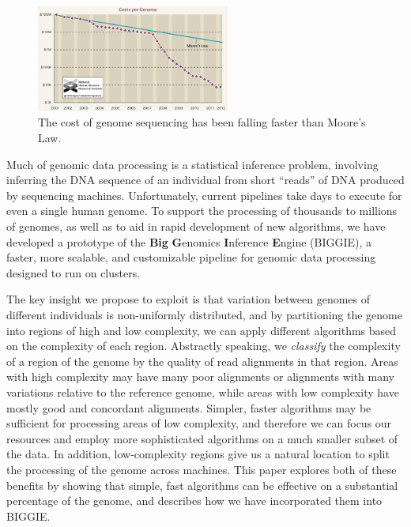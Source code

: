 \documentclass[12pt]{article}
\newcommand\TODO[1]{\textcolor{red}{TODO: #1}}
\begin{document}
\begin{figure}[h!]
  \centering
  \includegraphics[width=2.5in]{figs/sequencing-costs.png}
  \caption{The cost of genome sequencing has been falling faster than Moore's Law.}
  \label{moore}
\end{figure}

Much of genomic data processing is a statistical inference problem, involving
inferring the DNA sequence of an individual from short ``reads'' of DNA produced
by sequencing machines. Unfortunately, current pipelines take days to execute
for even a single human genome.
To support the processing of thousands to millions of genomes, as well as to
aid in rapid development of new algorithms, we have developed a prototype of the {\bf Big} {\bf G}enomics {\bf I}nference
{\bf E}ngine (BIGGIE), a faster, more scalable, and customizable pipeline for
genomic data processing designed to run on clusters.  

The key insight we propose to exploit is that variation between
genomes of different individuals is non-uniformly distributed, and by
partitioning the genome into regions of high and low complexity, we can apply
different algorithms based on the complexity of each region.
Abstractly speaking, we \emph{classify} the complexity of a region of the genome
by the quality of read alignments in that region.  Areas with high complexity may
have many poor alignments or alignments with many variations relative to the
reference genome, while areas with low complexity have mostly good and
concordant alignments.
Simpler, faster algorithms may be sufficient for processing areas of low
complexity, and therefore we can focus our resources and employ more
sophisticated algorithms on a
much smaller subset of the data. In addition, low-complexity regions give us a
natural location to split the processing of the genome across machines.
This paper explores both of these benefits by showing that simple, fast algorithms
can be effective on a substantial percentage of the genome, and describes how we have 
incorporated them into BIGGIE.
\end{document}

